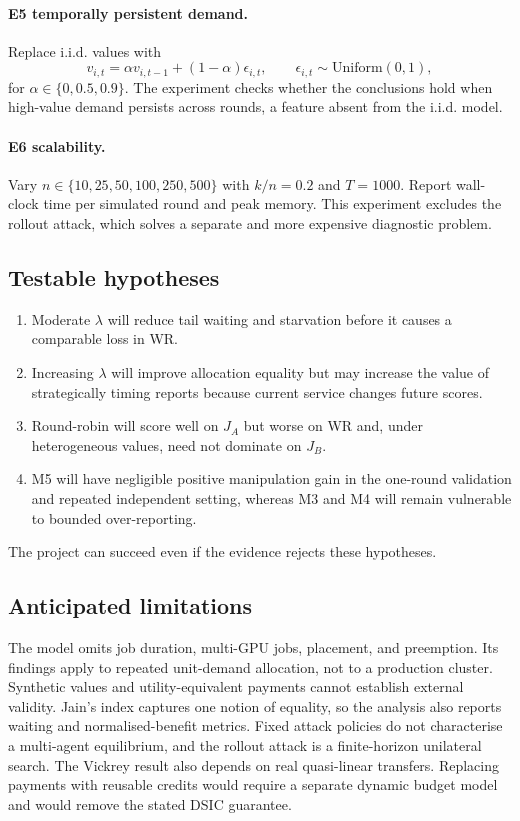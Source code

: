 \documentclass{article}
\begin{document}
\paragraph{E5 temporally persistent demand.}
Replace i.i.d. values with
\[
  v_{i,t}=\alpha v_{i,t-1}+(1-\alpha)\epsilon_{i,t},
  \qquad \epsilon_{i,t}\sim\mathrm{Uniform}(0,1),
\]
for $\alpha\in\{0,0.5,0.9\}$. The experiment checks whether the conclusions
hold when high-value demand persists across rounds, a feature absent from the
i.i.d. model.

\paragraph{E6 scalability.}
Vary $n\in\{10,25,50,100,250,500\}$ with $k/n=0.2$ and $T=1000$.
Report wall-clock time per simulated round and peak memory. This experiment
excludes the rollout attack, which solves a separate and more expensive
diagnostic problem.

\subsection{Testable hypotheses}

\begin{enumerate}
  \item Moderate $\lambda$ will reduce tail waiting and starvation before it
        causes a comparable loss in WR.
  \item Increasing $\lambda$ will improve allocation equality but may increase
        the value of strategically timing reports because current service
        changes future scores.
  \item Round-robin will score well on $J_A$ but worse on WR and, under
        heterogeneous values, need not dominate on $J_B$.
  \item M5 will have negligible positive manipulation gain in the one-round
        validation and repeated independent setting, whereas M3 and M4 will
        remain vulnerable to bounded over-reporting.
\end{enumerate}
The project can succeed even if the evidence rejects these hypotheses.

\subsection{Anticipated limitations}

The model omits job duration, multi-GPU jobs, placement, and preemption. Its
findings apply to repeated unit-demand allocation, not to a production cluster.
Synthetic values and utility-equivalent payments cannot establish external
validity. Jain's index captures one notion of equality, so the analysis also
reports waiting and normalised-benefit metrics. Fixed attack policies do not
characterise a multi-agent equilibrium, and the rollout attack is a
finite-horizon unilateral search. The Vickrey result also depends on real
quasi-linear transfers. Replacing payments with reusable credits would require
a separate dynamic budget model and would remove the stated DSIC guarantee.
\end{document}
